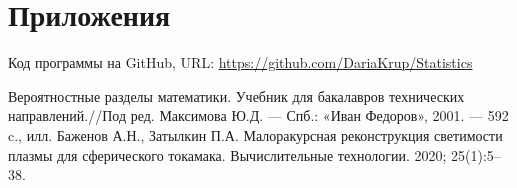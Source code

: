 \documentclass[a4paper,12pt]{article} %
\begin{document}
	\section{Приложения}
	Код программы на GitHub, URL:
	\url{https://github.com/DariaKrup/Statistics}
	\begin{thebibliography}{99}
		   Вероятностные разделы математики. Учебник для бакалавров технических направлений.//Под ред. Максимова Ю.Д. — Спб.: «Иван Федоров», 2001. — 592 c., илл.
		 Баженов А.Н., Затылкин П.А. Малоракурсная реконструкция светимости плазмы для сферического токамака. Вычислительные технологии. 2020; 25(1):5–38.
	\end{thebibliography}
\end{document}
